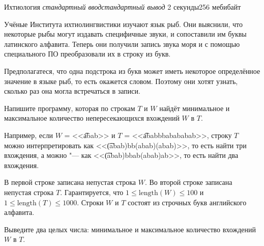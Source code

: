 %
%
\begin{problem}{Ихтиология}
{\textsl{стандартный ввод}}{\textsl{стандартный вывод}}
{2 секунды}{256 мебибайт}{}

Учёные Института ихтиолингвистики изучают язык рыб. Они выяснили, что некоторые
рыбы могут издавать специфичные звуки, и сопоставили им буквы латинского
алфавита. Теперь они получили запись звука моря и с помощью специального ПО
преобразовали их в строку из букв.

Предполагатеся, что одна подстрока из букв может иметь некоторое определённое
значение в языке рыб, то есть окажется словом.
Поэтому они хотят узнать, сколько раз она могла встречаться в записи.

Напишите программу, которая по строкам $T$ и $W$ найдёт минимальное и максимальное
количество непересекающихся вхождений $W$ в $T$.

Например, если $W$ = <<\t{abab}>> и $T$ = <<\t{ababbbabababab}>>,
строку $T$ можно
интерпретировать как <<\t{(abab)bb(abab)(abab)}>>, то есть найти три вхождения,
а можно "--- как <<\t{(abab)bbab(abab)ab}>>, то есть найти два вхождения.

\InputFile

В первой строке записана непустая строка $W$.
Во второй строке записана непустая строка $T$.
Гарантируется, что $1 \le \mathrm{length} (W) \le 100$ и
$1 \le \mathrm{length} (T) \le 1000$.
Строки $W$ и $T$ состоят из строчных букв английского алфавита.

\OutputFile

Выведите два целых числа: минимальное и максимальное количество вхождений
$W$ в $T$.

\Example

\begin{example}
%
\end{example}

\end{problem}
